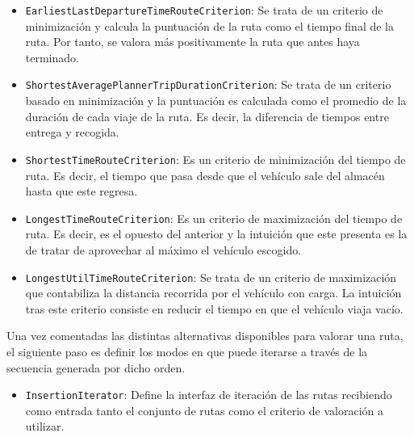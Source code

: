 \documentclass{subfiles}
\begin{document}
\begin{itemize}
\begin{itemize}
                      \item \texttt{EarliestLastDepartureTimeRouteCriterion}: Se trata de un criterio de minimización y calcula la puntuación de la ruta como el tiempo final de la ruta. Por tanto, se valora más positivamente la ruta que antes haya terminado.
                  
                      \item \texttt{ShortestAveragePlannerTripDurationCriterion}: Se trata de un criterio basado en minimización y la puntuación es calculada como el promedio de la duración de cada viaje de la ruta. Es decir, la diferencia de tiempos entre entrega y recogida.
                  
                      \item \texttt{ShortestTimeRouteCriterion}: Es un criterio de minimización del tiempo de ruta. Es decir, el tiempo que pasa desde que el vehículo sale del almacén hasta que este regresa.
                  
                      \item \texttt{LongestTimeRouteCriterion}: Es un criterio de maximización del tiempo de ruta. Es decir, es el opuesto del anterior y la intuición que este presenta es la de tratar de aprovechar al máximo el vehículo escogido.
                  
                      \item \texttt{LongestUtilTimeRouteCriterion}: Se trata de un criterio de maximización que contabiliza la distancia recorrida por el vehículo con carga. La intuición tras este criterio consiste en reducir el tiempo en que el vehículo viaja vacío.
                  
                  \end{itemize}
                  
                  Una vez comentadas las distintas alternativas disponibles para valorar una ruta, el siguiente paso es definir los modos en que puede iterarse a través de la secuencia generada por dicho orden.

                  \begin{itemize}

                      \item \texttt{InsertionIterator}: Define la interfaz de iteración de las rutas recibiendo como entrada tanto el conjunto de rutas como el criterio de valoración a utilizar.
                  

\end{itemize}
\end{itemize}
\end{document}
